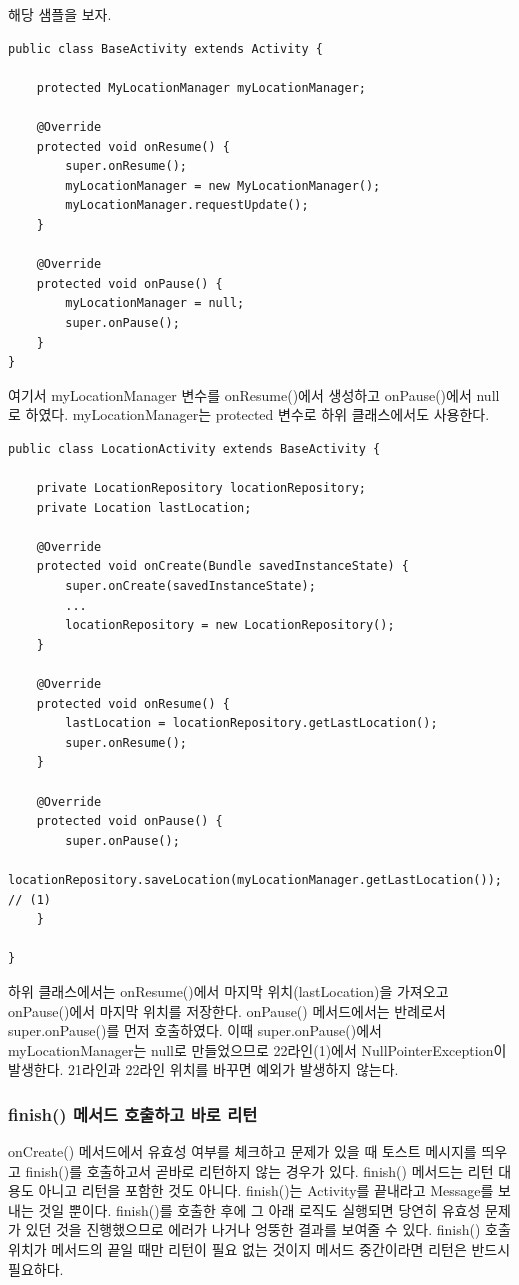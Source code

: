 해당 샘플을 보자.
\begin{lstlisting}[frame=single]
public class BaseActivity extends Activity {

	protected MyLocationManager myLocationManager;

	@Override
	protected void onResume() {
		super.onResume();
		myLocationManager = new MyLocationManager();
		myLocationManager.requestUpdate();
	}

	@Override
	protected void onPause() {
		myLocationManager = null;
		super.onPause();
	}
}
\end{lstlisting}
여기서 myLocationManager 변수를 onResume()에서 생성하고 onPause()에서 null로 하였다. myLocationManager는 protected 변수로 하위 클래스에서도 사용한다.

\begin{lstlisting}[frame=single]
public class LocationActivity extends BaseActivity {

	private LocationRepository locationRepository;
	private Location lastLocation;

	@Override
	protected void onCreate(Bundle savedInstanceState) {
		super.onCreate(savedInstanceState);
		...
		locationRepository = new LocationRepository();
	}

	@Override
	protected void onResume() {
		lastLocation = locationRepository.getLastLocation();
		super.onResume();
	}

	@Override
	protected void onPause() {
		super.onPause();
		locationRepository.saveLocation(myLocationManager.getLastLocation()); // (1)
	}

}
\end{lstlisting}
하위 클래스에서는 onResume()에서 마지막 위치(lastLocation)을 가져오고 onPause()에서 마지막 위치를 저장한다. onPause() 메서드에서는 반례로서 super.onPause()를 먼저 호출하였다. 이때 super.onPause()에서 myLocationManager는 null로 만들었으므로 22라인(1)에서 NullPointerException이 발생한다. 21라인과 22라인 위치를 바꾸면 예외가 발생하지 않는다. 

\subsubsection{finish() 메서드 호출하고 바로 리턴}
onCreate() 메서드에서 유효성 여부를 체크하고 문제가 있을 때 토스트 메시지를 띄우고 finish()를 호출하고서 곧바로 리턴하지 않는 경우가 있다. finish() 메서드는 리턴 대용도 아니고 리턴을 포함한 것도 아니다. finish()는 Activity를 끝내라고 Message를 보내는 것일 뿐이다. finish()를 호출한 후에 그 아래 로직도 실행되면 당연히 유효성 문제가 있던 것을 진행했으므로 에러가 나거나 엉뚱한 결과를 보여줄 수 있다. finish() 호출 위치가 메서드의 끝일 때만 리턴이 필요 없는 것이지 메서드 중간이라면 리턴은 반드시 필요하다.

